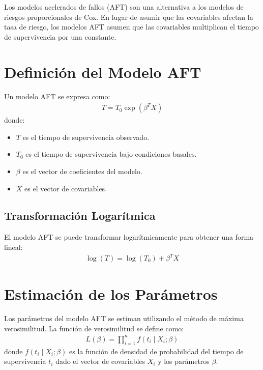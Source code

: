 \documentclass[a4paper]{report} %
\begin{document}
Los modelos acelerados de fallos (AFT) son una alternativa a los modelos de riesgos proporcionales de Cox. En lugar de asumir que las covariables afectan la tasa de riesgo, los modelos AFT asumen que las covariables multiplican el tiempo de supervivencia por una constante.

\section*{Definici\'on del Modelo AFT}
Un modelo AFT se expresa como:
\begin{eqnarray*}
T = T_0 \exp(\beta^T X)
\end{eqnarray*}
donde:
\begin{itemize}
    \item $T$ es el tiempo de supervivencia observado.
    \item $T_0$ es el tiempo de supervivencia bajo condiciones basales.
    \item $\beta$ es el vector de coeficientes del modelo.
    \item $X$ es el vector de covariables.
\end{itemize}

\subsection*{Transformaci\'on Logar\'itmica}
El modelo AFT se puede transformar logar\'itmicamente para obtener una forma lineal:
\begin{eqnarray*}
\log(T) = \log(T_0) + \beta^T X
\end{eqnarray*}

\section*{Estimaci\'on de los Par\'ametros}
Los par\'ametros del modelo AFT se estiman utilizando el m\'etodo de m\'axima verosimilitud. La funci\'on de verosimilitud se define como:
\begin{eqnarray*}
L(\beta) = \prod_{i=1}^n f(t_i \mid X_i; \beta)
\end{eqnarray*}
donde $f(t_i \mid X_i; \beta)$ es la funci\'on de densidad de probabilidad del tiempo de supervivencia $t_i$ dado el vector de covariables $X_i$ y los par\'ametros $\beta$.
\end{document}
